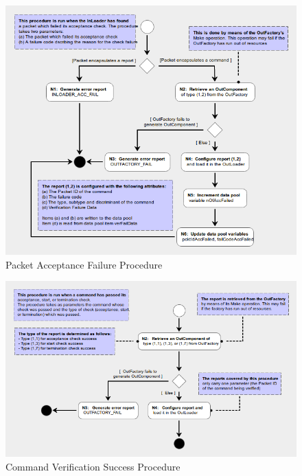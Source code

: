 \documentclass[a4paper,10pt]{article}
\begin{document}
\begin{figure}[htbp]
 \centering
 \includegraphics[scale=0.414,keepaspectratio=true]{CrPsPcktAccFail.png}
 \caption{Packet Acceptance Failure Procedure}
 \label{fig:PcktAccFail}
\end{figure}

\begin{figure}[htbp]
 \centering
 \includegraphics[scale=0.415,keepaspectratio=true]{CrPsCmdVerSucc.png}
 \caption{Command Verification Success Procedure}
 \label{fig:CmdVerSucc}
\end{figure}
\end{document}
